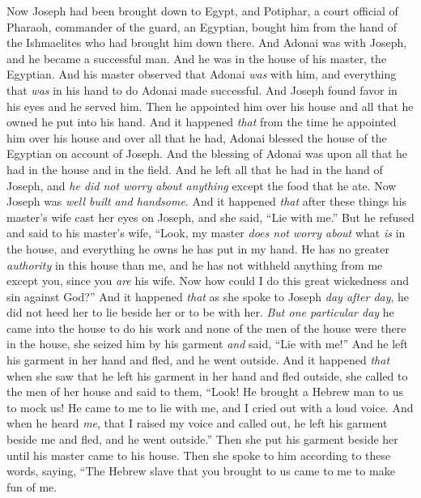\begin{biblechapter} %
 Now Joseph had been brought down to Egypt, and Potiphar, a court official of Pharaoh, commander of the guard, an Egyptian, bought him from the hand of the Ishmaelites who had brought him down there.
\verse And Adonai was with Joseph, and he became a successful man. And he was in the house of his master, the Egyptian.
\verse And his master observed that Adonai \textit{was} with him, and everything that \textit{was} in his hand to do Adonai made successful.
\verse And Joseph found favor in his eyes and he served him. Then he appointed him over his house and all that he owned he put into his hand.
\verse And it happened \textit{that} from the time he appointed him over his house and over all that he had, Adonai blessed the house of the Egyptian on account of Joseph. And the blessing of Adonai was upon all that he had in the house and in the field.
\verse And he left all that he had in the hand of Joseph, and \textit{he did not worry about anything} except the food that he ate. Now Joseph was \textit{well built and handsome}.
\verse And it happened \textit{that} after these things his master’s wife cast her eyes on Joseph, and she said, “Lie with me.”
\verse But he refused and said to his master’s wife, “Look, my master \textit{does not worry about} what \textit{is} in the house, and everything he owns he has put in my hand.
\verse He has no greater \textit{authority} in this house than me, and he has not withheld anything from me except you, since you \textit{are} his wife. Now how could I do this great wickedness and sin against God?”
\verse And it happened \textit{that} as she spoke to Joseph \textit{day after day}, he did not heed her to lie beside her or to be with her.
\verse \textit{But one particular day} he came into the house to do his work and none of the men of the house were there in the house,
\verse she seized him by his garment \textit{and} said, “Lie with me!” And he left his garment in her hand and fled, and he went outside.
\verse And it happened \textit{that} when she saw that he left his garment in her hand and fled outside,
\verse she called to the men of her house and said to them, “Look! He brought a Hebrew man to us to mock us! He came to me to lie with me, and I cried out with a loud voice.
\verse And when he heard \textit{me}, that I raised my voice and called out, he left his garment beside me and fled, and he went outside.”
\verse Then she put his garment beside her until his master came to his house.
\verse Then she spoke to him according to these words, saying, “The Hebrew slave that you brought to us came to me to make fun of me.

\end{biblechapter}
